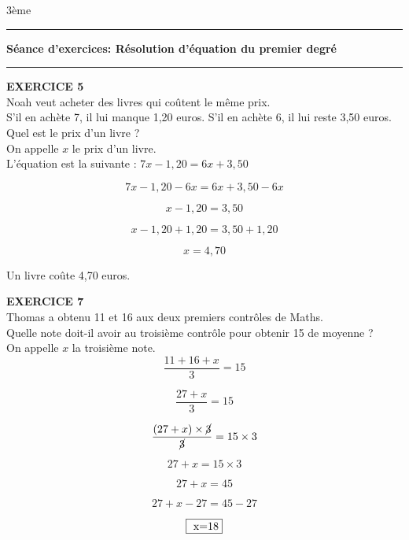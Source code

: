 \documentclass[a4paper,11pt]{article}
\newcommand{\titre}[5] 
{
\noindent #2 \hfill #4 \\
#3 \hfill #5

\vspace{-1.6cm}

\begin{center}\rule{6cm}{0.5mm}\end{center}
\vspace{0.2cm}
\begin{center}{\large{\textbf{#1}}}\end{center}
\begin{center}\rule{6cm}{0.5mm}\end{center}
}
\begin{document}
\pagestyle{empty}
\titre{Séance d'exercices: Résolution d'équation du premier degré}{}{}{3ème}{}

\vspace*{0.2cm}



 
 
 

\textbf{EXERCICE 5}\\

Noah veut acheter des livres qui coûtent le même prix.\\
S'il en achète 7, il lui manque 1,20 euros. S'il en achète 6, il lui reste 3,50 euros.\\

Quel est le prix d'un livre ?\\


\color{red}
On appelle $x$ le prix d'un livre.\\

L'équation est la suivante : \hspace*{1cm} $7x-1,20= 6x+3,50$ 


$$7x-1,20-6x= 6x+3,50-6x$$

$$x-1,20= 3,50$$

$$x-1,20+1,20=3,50+1,20$$

$$x=4,70$$

Un livre coûte 4,70 euros.\\

 \color{black}
\vspace*{0.5cm}


 
 \textbf{EXERCICE 7}\\

Thomas a obtenu 11 et 16 aux deux premiers contrôles de Maths.\\
Quelle note doit-il avoir au troisième contrôle pour obtenir 15 de moyenne ?\\

\color{red}
On appelle $x$ la troisième note.\\

$$\dfrac{11 + 16 + x}{3}=15$$

$$\dfrac{27 + x}{3}=15$$

$$\dfrac{(27+ x)\times \cancel{3}}{\cancel{3}}=15 \times 3$$


$$27+ x=15 \times 3$$

$$27+ x=45$$

$$27+ x-27=45-27$$

$$ \fbox{ x=18}$$
\end{document}

